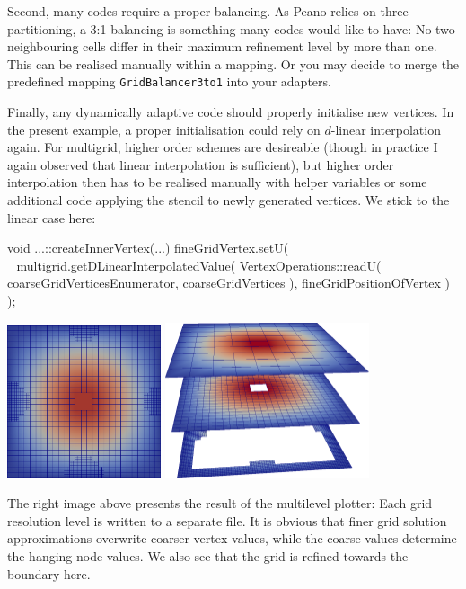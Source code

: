 \noindent
Second, many codes require a proper balancing. 
As Peano relies on three-partitioning, a 3:1 balancing is something many codes
would like to have: 
No two neighbouring cells differ in their maximum refinement level by more than
one.
This can be realised manually within a mapping. 
Or you may decide to merge the predefined mapping \texttt{GridBalancer3to1} into 
your adapters. 



Finally, any dynamically adaptive code should properly initialise new vertices. 
In the present example, a proper initialisation could rely on $d$-linear
interpolation again.
For multigrid, higher order schemes are desireable (though in practice I again
observed that linear interpolation is sufficient), but higher order
interpolation then has to be realised manually with helper variables or some
additional code applying the stencil to newly generated vertices.
We stick to the linear case here:
\begin{code}
void ...::createInnerVertex(...) {
  fineGridVertex.setU(
    _multigrid.getDLinearInterpolatedValue(
      VertexOperations::readU( coarseGridVerticesEnumerator, coarseGridVertices ),
      fineGridPositionOfVertex
    )
  );
}
\end{code}


\begin{center}
  \includegraphics[width=0.34\textwidth]{42_matrix-free-multigrid/DynamicB.png}
  \includegraphics[width=0.45\textwidth]{42_matrix-free-multigrid/MultiLevel.png}
\end{center}

\noindent
The right image above presents the result of the multilevel plotter:
Each grid resolution level is written to a separate file.
It is obvious that finer grid solution approximations overwrite coarser vertex
values, while the coarse values determine the hanging node values.
We also see that the grid is refined towards the boundary here.



